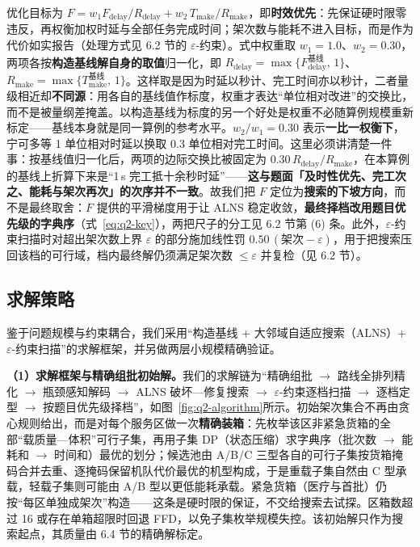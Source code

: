 优化目标为 $F=w_1 F_{\mathrm{delay}}/R_{\mathrm{delay}}+w_2\,T_{\mathrm{make}}/R_{\mathrm{make}}$，即\textbf{时效优先}：先保证硬时限零违反，再权衡加权时延与全部任务完成时间；架次数与能耗不进入目标，而是作为代价如实报告（处理方式见 6.2 节的 $\varepsilon$-约束）。式中权重取 $w_1=1.0$、$w_2=0.30$，两项各按\textbf{构造基线解自身的取值}归一化，即 $R_{\mathrm{delay}}=\max\{F_{\mathrm{delay}}^{\text{基线}},\,1\}$、$R_{\mathrm{make}}=\max\{T_{\mathrm{make}}^{\text{基线}},\,1\}$。这样取是因为时延以秒计、完工时间亦以秒计，二者量级相近却\textbf{不同源}：用各自的基线值作标度，权重才表达“单位相对改进”的交换比，而不是被量纲差掩盖。以构造基线为标度的另一个好处是权重不必随算例规模重新标定——基线本身就是同一算例的参考水平。$w_2/w_1=0.30$ 表示\textbf{一比一权衡下}，宁可多等 1 单位相对时延以换取 0.3 单位相对完工时间。这里必须讲清楚一件事：按基线值归一化后，两项的边际交换比被固定为 $0.30\,R_{\mathrm{delay}}/R_{\mathrm{make}}$，在本算例的基线上折算下来是“1\,s 完工抵十余秒时延”——\textbf{这与题面「及时性优先、完工次之、能耗与架次再次」的次序并不一致}。故我们把 $F$ 定位为\textbf{搜索的下坡方向}，而不是最终取舍：$F$ 提供的平滑梯度用于让 ALNS 稳定收敛，\textbf{最终择档改用题目优先级的字典序}（式~\eqref{eq:q2-key}），两把尺子的分工见 6.2 节第 (6) 条。此外，$\varepsilon$-约束扫描时对超出架次数上界 $\varepsilon$ 的部分施加线性罚 $0.50\,(\text{架次}-\varepsilon)$，用于把搜索压回该档的可行域，档内最终解仍须满足架次数 $\le\varepsilon$ 并复检（见 6.2 节）。

\subsection{求解策略}

鉴于问题规模与约束耦合，我们采用“构造基线 + 大邻域自适应搜索（ALNS）+ $\varepsilon$-约束扫描”的求解框架，并另做两层小规模精确验证。

\textbf{（1）求解框架与精确组批初始解。}我们的求解链为“精确组批 $\to$ 路线全排列精化 $\to$ 瓶颈感知解码 $\to$ ALNS 破坏—修复搜索 $\to$ $\varepsilon$-约束逐档扫描 $\to$ 逐档定型 $\to$ 按题目优先级择档”，如图~\ref{fig:q2-algorithm}所示。初始架次集合不再由贪心规则给出，而是对每个服务区做一次\textbf{精确装箱}：先枚举该区非紧急货箱的全部“载质量—体积”可行子集，再用子集 DP（状态压缩）求字典序（批次数 $\to$ 能耗和 $\to$ 时间和）最优的划分；候选池由 A/B/C 三型各自的可行子集按货箱掩码合并去重、逐掩码保留机队代价最优的机型构成，于是重载子集自然由 C 型承载，轻载子集则可能由 A/B 型以更低能耗承载。紧急货箱（医疗与首批）仍按“每区单独成架次”构造——这条是硬时限的保证，不交给搜索去试探。区箱数超过 16 或存在单箱超限时回退 FFD，以免子集枚举规模失控。该初始解只作为搜索起点，其质量由 6.4 节的精确解标定。

